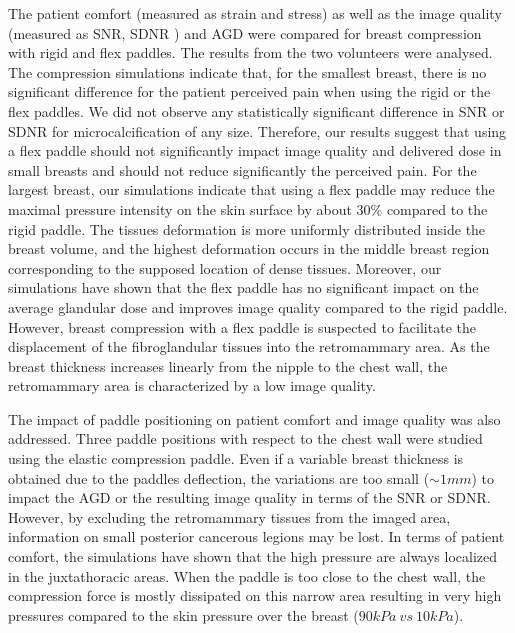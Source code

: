 The patient comfort (measured as strain and stress) as well as the image quality (measured as SNR, SDNR ) and AGD were compared for breast compression with rigid and flex paddles. The results from the two volunteers were analysed. The compression simulations indicate that, for the smallest breast, there is no significant difference for the patient perceived pain when using the rigid or the flex paddles. We did not observe any statistically significant difference in SNR or SDNR for microcalcification of any size. Therefore, our results suggest that using a flex paddle should not significantly impact image quality and delivered dose in small breasts and should not reduce significantly the perceived pain.   
For the largest breast, our simulations indicate that using a flex paddle may reduce the maximal pressure intensity on the skin surface by about 30\% compared to the rigid paddle. The tissues deformation is more uniformly distributed inside the breast volume, and the highest deformation occurs in the middle breast region corresponding to the supposed location of dense tissues. Moreover, our simulations have shown that the flex paddle has no significant impact on the average glandular dose and improves image quality compared to the rigid paddle. However, breast compression with a flex paddle is suspected to facilitate the displacement of the fibroglandular tissues into the retromammary area. As the breast thickness increases linearly from the nipple to the chest wall, the retromammary area is characterized by a low image quality. 


The impact of paddle positioning on patient comfort and image quality was also addressed. Three paddle positions with respect to the chest wall were studied using the elastic compression paddle. Even if a variable breast thickness is obtained due to the paddles deflection, the variations are too small ($\sim 1mm$) to impact the AGD or the resulting image quality in terms of the SNR or SDNR. However, by excluding the retromammary tissues from the imaged area, information on small posterior cancerous legions may be lost. In terms of patient comfort, the simulations have shown that the high pressure are always localized in the juxtathoracic areas. When the paddle is too close to the chest wall, the compression force is mostly dissipated on this narrow area resulting in very high pressures compared to the skin pressure over the breast ($90kPa\ vs\ 10kPa$).
